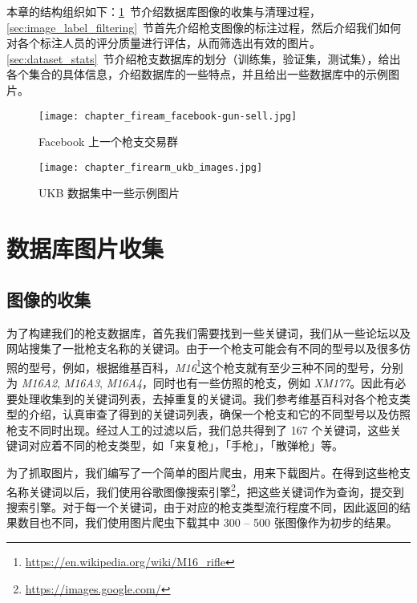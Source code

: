 本章的结构组织如下：\ref{sec:image_collect_clean}~节介绍数据库图像的收集与清理过程，\ref{sec:image_label_filtering}~节首先介绍枪支图像的标注过程，然后介绍我们如何对各个标注人员的评分质量进行评估，从而筛选出有效的图片。\ref{sec:dataset_stats}~节介绍枪支数据库的划分（训练集，验证集，测试集），给出各个集合的具体信息，介绍数据库的一些特点，并且给出一些数据库中的示例图片。

\begin{figure}[!t]
	\centering
	\texttt{[image: chapter\_fiream\_facebook-gun-sell.jpg]}
	\caption[Facebook 上一个枪支交易群]{Facebook 上一个枪支交易群\footnotemark}
	\label{fig:ukb_images}
\end{figure}

\begin{figure}[!t]
	\centering
	\texttt{[image: chapter\_firearm\_ukb\_images.jpg]}
	\caption{UKB 数据集中一些示例图片}
	\label{fig:gun_sell_group}
\end{figure}

\section{数据库图片收集}\label{sec:image_collect_clean}

\subsection{图像的收集}
为了构建我们的枪支数据库，首先我们需要找到一些关键词，我们从一些论坛以及网站搜集了一批枪支名称的关键词。由于一个枪支可能会有不同的型号以及很多仿照的型号，例如，根据维基百科，\emph{M16}\footnote{\url{https://en.wikipedia.org/wiki/M16_rifle}}这个枪支就有至少三种不同的型号，分别为 \emph{M16A2}, \emph{M16A3}, \emph{M16A4}，同时也有一些仿照的枪支，例如 \emph{XM177}。因此有必要处理收集到的关键词列表，去掉重复的关键词。我们参考维基百科对各个枪支类型的介绍，认真审查了得到的关键词列表，确保一个枪支和它的不同型号以及仿照枪支不同时出现。经过人工的过滤以后，我们总共得到了 167 个关键词，这些关键词对应着不同的枪支类型，如「来复枪」，「手枪」，「散弹枪」等。

为了抓取图片，我们编写了一个简单的图片爬虫，用来下载图片。在得到这些枪支名称关键词以后，我们使用谷歌图像搜索引擎\footnote{\url{https://images.google.com/}}，把这些关键词作为查询，提交到搜索引擎。对于每一个关键词，由于对应的枪支类型流行程度不同，因此返回的结果数目也不同，我们使用图片爬虫下载其中 300 -- 500 张图像作为初步的结果。

